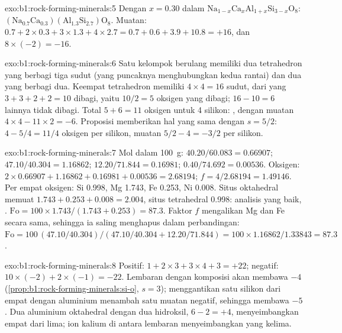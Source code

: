 \begin{solution}{exo:b1:rock-forming-minerals:5}
Dengan $x = 0.30$ dalam $\mathrm{Na}_{1-x}\mathrm{Ca}_x\mathrm{Al}_{1+x}\mathrm{Si}_{3-x}\mathrm{O}_8$:
$\mathrm{(Na_{0.7}Ca_{0.3})(Al_{1.3}Si_{2.7})O_8}$. Muatan:
$0.7 + 2\times0.3 + 3\times1.3 + 4\times2.7 = 0.7 + 0.6 + 3.9 + 10.8 = +16$,
dan $8\times(-2) = -16$.
\end{solution}

\begin{solution}{exo:b1:rock-forming-minerals:6}
Satu kelompok berulang memiliki dua tetrahedron yang berbagi tiga sudut (yang puncaknya menghubungkan kedua rantai) dan dua yang berbagi dua. Keempat tetrahedron memiliki $4\times4 = 16$ sudut, dari yang $3 + 3 + 2 + 2 = 10$ dibagi, yaitu
$10/2 = 5$ oksigen yang dibagi; $16 - 10 = 6$ lainnya tidak dibagi. Total
$5 + 6 = 11$ oksigen untuk 4 silikon: , dengan muatan
$4\times4 - 11\times2 = -6$. Proposisi memberikan hal yang sama dengan
$s = 5/2$: $4 - 5/4 = 11/4$ oksigen per silikon, muatan $5/2 - 4 = -3/2$ per
silikon.
\end{solution}

\begin{solution}{exo:b1:rock-forming-minerals:7}
Mol dalam \qty{100}{g}:  $40.20/60.083 = 0.66907$; 
$47.10/40.304 = 1.16862$;  $12.20/71.844 = 0.16981$; 
$0.40/74.692 = 0.00536$. Oksigen: $2\times0.66907 + 1.16862 + 0.16981 +
0.00536 = 2.68194$; $f = 4/2.68194 = 1.49146$. Per empat oksigen: Si
\num{0.998}, Mg \num{1.743}, Fe \num{0.253}, Ni \num{0.008}. Situs oktahedral memuat $1.743 + 0.253 + 0.008 = 2.004$, situs tetrahedral
\num{0.998}: analisis yang baik, .
$\mathrm{Fo} = 100\times1.743/(1.743 + 0.253) = 87.3$. Faktor $f$
mengalikan Mg dan Fe secara sama, sehingga ia saling menghapus dalam perbandingan:
$\mathrm{Fo} = 100\,(47.10/40.304)/(47.10/40.304 + 12.20/71.844) =
100\times1.16862/1.33843 = 87.3$.
\end{solution}

\begin{solution}{exo:b1:rock-forming-minerals:8}
Positif: $1 + 2\times3 + 3\times4 + 3 = +22$; negatif:
$10\times(-2) + 2\times(-1) = -22$. Lembaran dengan komposisi  akan membawa $-4$ (\cref{prop:b1:rock-forming-minerals:si-o}, $s = 3$); menggantikan satu silikon dari empat dengan aluminium menambah satu muatan negatif, sehingga  membawa $-5$. Dua aluminium oktahedral dengan dua hidroksil, $6 - 2 = +4$, menyeimbangkan empat dari lima; ion kalium di antara lembaran menyeimbangkan yang kelima.
\end{solution}


